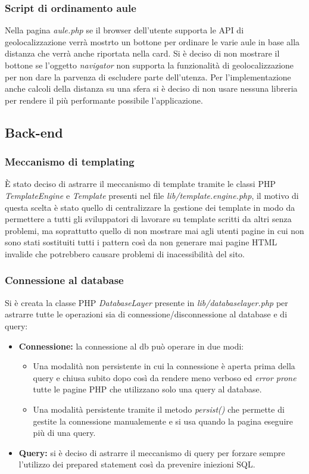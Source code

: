 \subsubsection{Script di ordinamento aule}
Nella pagina \textit{aule.php} se il browser dell'utente supporta le API di geolocalizzazione verrà mostrto un bottone per ordinare le varie aule in base alla distanza che verrà anche riportata nella card. Si è deciso di non mostrare il bottone se l'oggetto \textit{navigator} non supporta la funzionalità di geolocalizzazione per non dare la parvenza di escludere parte dell'utenza. Per l'implementazione anche calcoli della distanza su una sfera si è deciso di
non usare nessuna libreria per rendere il più performante possibile l'applicazione.

\subsection{Back-end}

\subsubsection{Meccanismo di templating}
È stato deciso di astrarre il meccanismo di template tramite le classi PHP \textit{TemplateEngine} e \textit{Template} presenti nel file \textit{lib/template.engine.php}, il motivo di questa scelta è stato quello di centralizzare la gestione dei template in modo da permettere a tutti gli sviluppatori di lavorare su template scritti da altri senza problemi, ma soprattutto quello di non mostrare mai agli utenti pagine in cui non sono stati sostituiti tutti i pattern così da non generare mai pagine HTML invalide che potrebbero causare problemi di inacessibilità del sito.

\subsubsection{Connessione al database}
Si è creata la classe PHP \textit{DatabaseLayer} presente in \textit{lib/databaselayer.php} per astrarre tutte le operazioni sia di connessione/disconnessione al database e di query:
\begin{itemize}
    \item \textbf{Connessione:} la connessione al db può operare in due modi:
    \begin{itemize}
        \item Una modalità non persistente in cui la connessione è aperta prima della query e chiusa subito dopo così da rendere meno verboso ed \textit{error prone} tutte le pagine PHP che utilizzano solo una query al database.
        \item Una modalità persistente tramite il metodo \textit{persist()} che permette di gestite la connessione manualemente e si usa quando la pagina eseguire più di una query.
    \end{itemize}
    \item \textbf{Query:} si è deciso di astrarre il meccanismo di query per forzare sempre l'utilizzo dei prepared statement così da prevenire iniezioni SQL.
\end{itemize}

